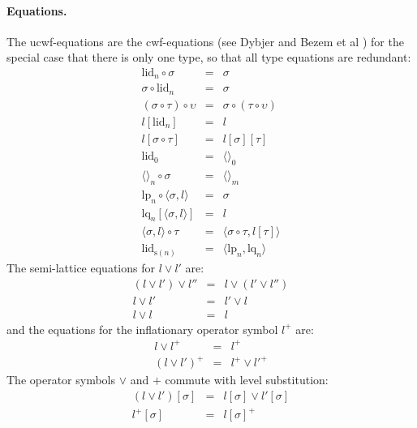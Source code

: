 \documentclass[11pt,a4paper]{article}
\theoremstyle{plain}
\theoremstyle{definition}
\newcommand{\id}{\mathsf{id}}
\def\sub{\mathrm{hom}}
\def\id{\mathrm{id}}
\def\lctx{\mathrm{lctx}}
\def\lp{\mathrm{lp}}
\def\lq{\mathrm{lq}}
\def\s{\mathrm{s}}
\def\lid{\mathrm{lid}}
\newcommand{\ctx}{\mathrm{ctx}}
\newcommand{\ty}{\mathrm{ty}}
\newcommand{\tm}{\mathrm{tm}}
\newcommand{\tuple}[1]{\langle #1 \rangle}
\begin{document}
\paragraph{Equations.}
The ucwf-equations are the cwf-equations (see Dybjer \cite{dybjer:torino} and Bezem et al \cite{BezemCDE22})
for the special case that there is only one type, so that all type equations are redundant:
\begin{eqnarray*}
\lid_{n} \circ \sigma &=& \sigma \\
 \sigma \circ \lid_{n} &=& \sigma \\
(\sigma \circ \tau) \circ \upsilon &=& \sigma \circ (\tau \circ \upsilon)\\
l[\lid_{n}] &=& l \\
l[\sigma\circ\tau] &=& l[\sigma][\tau]\\
\lid_{0} &=& \tuple{}_{0}\\
\tuple{}_{n}\circ\sigma &=& \tuple{}_{m}\\
\lp_n \circ \tuple{\sigma,l} &=& \sigma\\
\lq_n [\tuple{\sigma,l}] &=& l\\
\tuple{\sigma,l} \circ \tau &=& \tuple{\sigma \circ \tau,l[\tau]}\\
\lid_{\s(n)} &=& \tuple{\lp_n,\lq_n}
\end{eqnarray*}
The semi-lattice equations for $l \vee l'$ are:
\begin{eqnarray*}
(l \vee l') \vee l'' &=& l \vee (l' \vee l'')\\
l \vee l' &=& l'\vee l\\
l \vee l &=& l
\end{eqnarray*}
and the equations for the inflationary operator symbol $l^+$ are:
\begin{eqnarray*}
l \vee l^+ &=& l^+\\
(l\vee l')^+ &=& l^+\vee l'^+
\end{eqnarray*}
The operator symbols $\vee$ and $+$ commute with level substitution:
\begin{eqnarray*}
(l \vee l')[\sigma] &=& l[\sigma] \vee l' [\sigma]\\
 l^+[\sigma] &=&  l[\sigma]^+
\end{eqnarray*}
\end{document}
